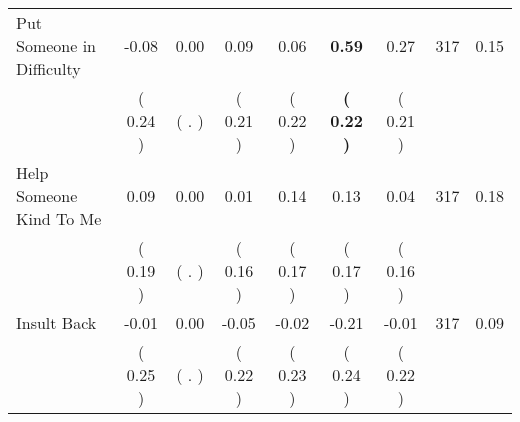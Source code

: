 \begin{tabular}{lcccccccc}
Put Someone in Difficulty &     -0.08 &      0.00 &      0.09 &      0.06 & \textbf{     0.59} &      0.27 & 317 &       0.15 \\ 
 & (     0.24 ) & (        . ) & (     0.21 ) & (     0.22 ) & \textbf{(     0.22 )} & (     0.21 ) & \\
Help Someone Kind To Me &      0.09 &      0.00 &      0.01 &      0.14 &      0.13 &      0.04 & 317 &       0.18 \\ 
 & (     0.19 ) & (        . ) & (     0.16 ) & (     0.17 ) & (     0.17 ) & (     0.16 ) & \\
Insult Back &     -0.01 &      0.00 &     -0.05 &     -0.02 &     -0.21 &     -0.01 & 317 &       0.09 \\ 
 & (     0.25 ) & (        . ) & (     0.22 ) & (     0.23 ) & (     0.24 ) & (     0.22 ) & \\
\bottomrule
\end{tabular}
